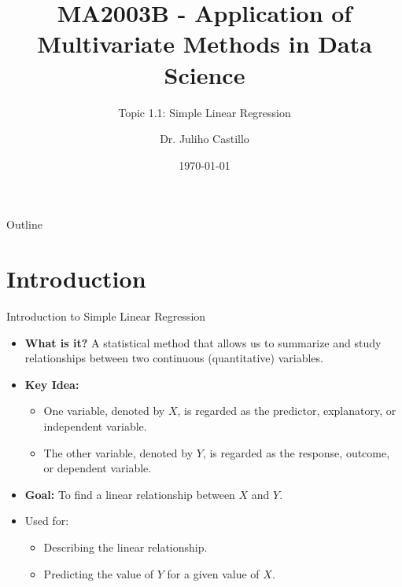 \documentclass[aspectratio=169]{beamer}
\title[Simple Linear Regression]{MA2003B - Application of Multivariate Methods in Data Science}
\subtitle{Topic 1.1: Simple Linear Regression}
\author{Dr. Juliho Castillo} %
\institute{Tec de Monterrey} %
\date{\today}
\begin{document}
\begin{frame}
  \titlepage
\end{frame}

\begin{frame}{Outline}
  \tableofcontents
\end{frame}

\section{Introduction}
\begin{frame}{Introduction to Simple Linear Regression}
  \begin{itemize}
    \item \textbf{What is it?} A statistical method that allows us to summarize and study relationships between two continuous (quantitative) variables.
    \item \textbf{Key Idea:}
    \begin{itemize}
        \item One variable, denoted by $X$, is regarded as the predictor, explanatory, or independent variable.
        \item The other variable, denoted by $Y$, is regarded as the response, outcome, or dependent variable.
    \end{itemize}
    \item \textbf{Goal:} To find a linear relationship between $X$ and $Y$.
    \item Used for:
    \begin{itemize}
        \item Describing the linear relationship.
        \item Predicting the value of $Y$ for a given value of $X$.
    \end{itemize}
  \end{itemize}
\end{frame}
\end{document}
